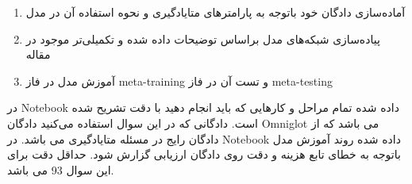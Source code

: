 \documentclass{article}
\begin{document}
\begin{enumerate}
	
	\item
	آماده‌سازی دادگان خود باتوجه به پارامترهای متایادگیری و نحوه استفاده آن در مدل
	\item
	پیاده‌سازی شبکه‌های مدل براساس توضیحات داده شده و تکمیلی‌تر موجود در مقاله
	\item
	آموزش مدل در فاز meta-training و تست آن در فاز meta-testing
	
\end{enumerate}
	
در Notebook داده شده تمام مراحل و کار‌هایی که باید انجام دهید با دقت تشریح شده است. دادگانی که در این سوال استفاده می‌کنید دادگان Omniglot می باشد که از دادگان رایج در مسئله متایادگیری می باشد.
در Notebook داده شده روند آموزش مدل باتوجه به خطای تابع هزینه و دقت روی دادگان ارزیابی گزارش شود. حداقل دقت برای این سوال 93 می باشد.
\end{document}
